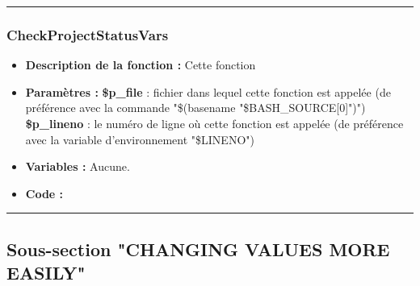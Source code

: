 \documentclass[a4paper,10pt]{article}
\begin{document}
\color{blue}\par\noindent\rule{\textwidth}{0.4pt}\color{white}

\color{blue}
\subsubsection{CheckProjectStatusVars}\color{white}
\begin{itemize}
    \item \textbf{Description de la fonction :} Cette fonction

    \item \textbf{Paramètres :}
        \color{orange}\textbf{\$p\_file}\color{white} : fichier dans lequel cette fonction est appelée (de préférence avec la commande "\$(\color{gray}basename \color{white}"\color{orange}\$BASH\_SOURCE[0]\color{white}")")
    \color{orange}\textbf{\$p\_lineno}\color{white} : le numéro de ligne où cette fonction est appelée (de préférence avec la variable d'environnement "\color{orange}\$LINENO\color{white}")

    \item \textbf{Variables :} Aucune.

    \item \textbf{Code :}
\end{itemize}



\color{green}\par\noindent\rule{\textwidth}{0.4pt}\color{white}

\color{green}
\subsection{Sous-section "CHANGING VALUES MORE EASILY"}\color{white}
\end{document}
